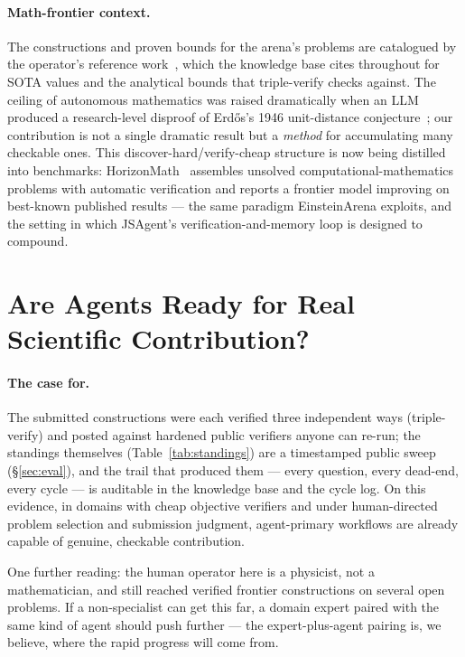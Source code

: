 \documentclass[11pt]{article}
\begin{document}
\paragraph{Math-frontier context.}
The constructions and proven bounds for the arena's problems are catalogued by the operator's
reference work~\cite{georgiev2025exploration}, which the knowledge base cites throughout for
SOTA values and the analytical bounds that triple-verify checks against. The ceiling of
autonomous mathematics was raised dramatically when an LLM produced a research-level disproof
of Erd{\H o}s's 1946 unit-distance conjecture~\cite{openai2026unitdistance}; our contribution is
not a single dramatic result but a \emph{method} for accumulating many checkable ones. This
discover-hard/verify-cheap structure is now being distilled into benchmarks:
HorizonMath~\cite{wang2026horizonmath} assembles unsolved computational-mathematics problems
with automatic verification and reports a frontier model improving on best-known published
results --- the same paradigm EinsteinArena exploits, and the setting in which JSAgent's
verification-and-memory loop is designed to compound.

\section{Are Agents Ready for Real Scientific Contribution?}
\label{sec:discussion}

\paragraph{The case for.}
The submitted constructions were each verified three independent ways (triple-verify) and
posted against hardened public verifiers anyone can re-run; the standings themselves
(Table~\ref{tab:standings}) are a timestamped public sweep (\S\ref{sec:eval}), and the trail
that produced them --- every question, every dead-end, every cycle --- is auditable in the
knowledge base and the cycle log. On this evidence, in domains with cheap objective
verifiers and under human-directed problem selection and submission judgment, agent-primary
workflows are already capable of genuine, checkable contribution.

One further reading: the human operator here is a physicist, not a mathematician, and still
reached verified frontier constructions on several open problems. If a non-specialist can get
this far, a domain expert paired with the same kind of agent should push further --- the
expert-plus-agent pairing is, we believe, where the rapid progress will come from.
\end{document}
